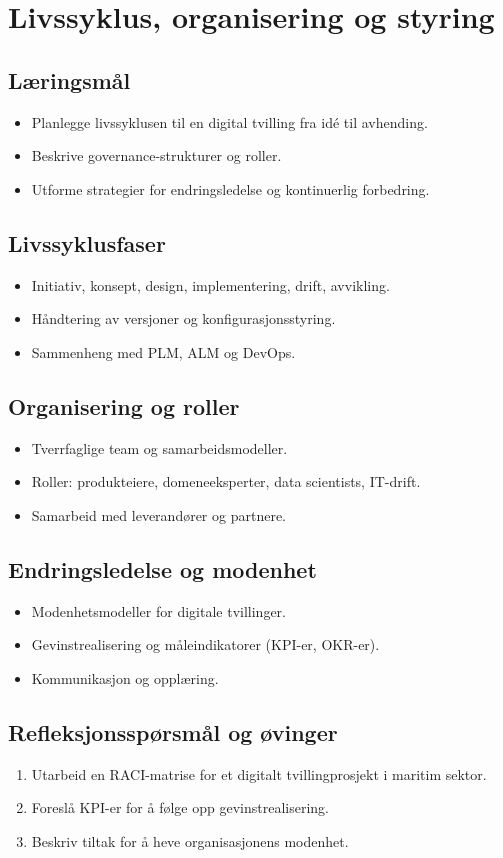 \chapter{Livssyklus, organisering og styring}

\section{Læringsmål}
\begin{itemize}
    \item Planlegge livssyklusen til en digital tvilling fra idé til avhending.
    \item Beskrive governance-strukturer og roller.
    \item Utforme strategier for endringsledelse og kontinuerlig forbedring.
\end{itemize}

\section{Livssyklusfaser}
\begin{itemize}
    \item Initiativ, konsept, design, implementering, drift, avvikling.
    \item Håndtering av versjoner og konfigurasjonsstyring.
    \item Sammenheng med PLM, ALM og DevOps.
\end{itemize}

\section{Organisering og roller}
\begin{itemize}
    \item Tverrfaglige team og samarbeidsmodeller.
    \item Roller: produkteiere, domeneeksperter, data scientists, IT-drift.
    \item Samarbeid med leverandører og partnere.
\end{itemize}

\section{Endringsledelse og modenhet}
\begin{itemize}
    \item Modenhetsmodeller for digitale tvillinger.
    \item Gevinstrealisering og måleindikatorer (KPI-er, OKR-er).
    \item Kommunikasjon og opplæring.
\end{itemize}

\section{Refleksjonsspørsmål og øvinger}
\begin{enumerate}
    \item Utarbeid en RACI-matrise for et digitalt tvillingprosjekt i maritim sektor.
    \item Foreslå KPI-er for å følge opp gevinstrealisering.
    \item Beskriv tiltak for å heve organisasjonens modenhet.
\end{enumerate}

